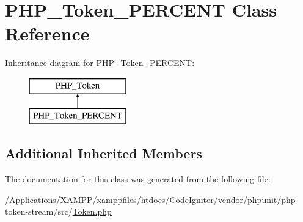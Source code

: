 \hypertarget{class_p_h_p___token___p_e_r_c_e_n_t}{}\section{P\+H\+P\+\_\+\+Token\+\_\+\+P\+E\+R\+C\+E\+NT Class Reference}
\label{class_p_h_p___token___p_e_r_c_e_n_t}
Inheritance diagram for P\+H\+P\+\_\+\+Token\+\_\+\+P\+E\+R\+C\+E\+NT\+:\begin{figure}[H]
\begin{center}
\leavevmode
\includegraphics[height=2.000000cm]{class_p_h_p___token___p_e_r_c_e_n_t}
\end{center}
\end{figure}
\subsection*{Additional Inherited Members}


The documentation for this class was generated from the following file\+:\begin{DoxyCompactItemize}
\item 
/\+Applications/\+X\+A\+M\+P\+P/xamppfiles/htdocs/\+Code\+Igniter/vendor/phpunit/php-\/token-\/stream/src/\mbox{\hyperlink{_token_8php}{Token.\+php}}\end{DoxyCompactItemize}
